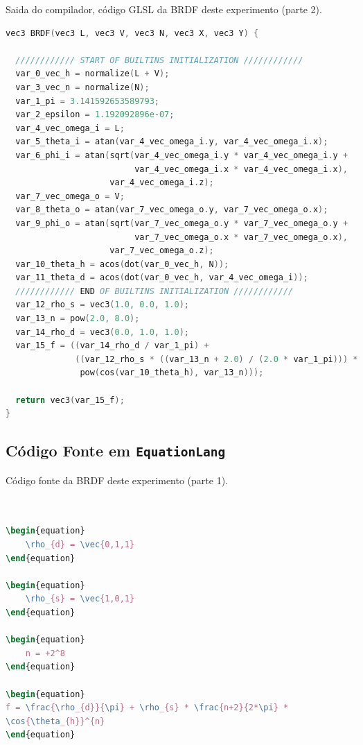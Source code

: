 \begin{codigo}[H]
    \caption{\small Saida do compilador, código GLSL da BRDF deste experimento  (parte 2). }
    \label{cod-blinn-phong-glsl-pt-2}
\begin{lstlisting}[language=C, inputencoding=utf8]
vec3 BRDF(vec3 L, vec3 V, vec3 N, vec3 X, vec3 Y) {

  //////////// START OF BUILTINS INITIALIZATION ////////////
  var_0_vec_h = normalize(L + V);
  var_3_vec_n = normalize(N);
  var_1_pi = 3.141592653589793;
  var_2_epsilon = 1.192092896e-07;
  var_4_vec_omega_i = L;
  var_5_theta_i = atan(var_4_vec_omega_i.y, var_4_vec_omega_i.x);
  var_6_phi_i = atan(sqrt(var_4_vec_omega_i.y * var_4_vec_omega_i.y +
                          var_4_vec_omega_i.x * var_4_vec_omega_i.x),
                     var_4_vec_omega_i.z);
  var_7_vec_omega_o = V;
  var_8_theta_o = atan(var_7_vec_omega_o.y, var_7_vec_omega_o.x);
  var_9_phi_o = atan(sqrt(var_7_vec_omega_o.y * var_7_vec_omega_o.y +
                          var_7_vec_omega_o.x * var_7_vec_omega_o.x),
                     var_7_vec_omega_o.z);
  var_10_theta_h = acos(dot(var_0_vec_h, N));
  var_11_theta_d = acos(dot(var_0_vec_h, var_4_vec_omega_i));
  //////////// END OF BUILTINS INITIALIZATION ////////////
  var_12_rho_s = vec3(1.0, 0.0, 1.0);
  var_13_n = pow(2.0, 8.0);
  var_14_rho_d = vec3(0.0, 1.0, 1.0);
  var_15_f = ((var_14_rho_d / var_1_pi) +
              ((var_12_rho_s * ((var_13_n + 2.0) / (2.0 * var_1_pi))) *
               pow(cos(var_10_theta_h), var_13_n)));

  return vec3(var_15_f);
}
\end{lstlisting}
\end{codigo}

\subsection{Código Fonte em \texttt{EquationLang}}
\begin{codigo}[H]
    \caption{\small Código fonte da BRDF deste experimento (parte 1).}
    \label{cod-blinn-phong-eqlang}
\begin{lstlisting}[language=tex, frame=none, inputencoding=utf8]


\begin{equation}
    \rho_{d} = \vec{0,1,1}
\end{equation}

\begin{equation}
    \rho_{s} = \vec{1,0,1}
\end{equation}

\begin{equation}
    n = +2^8
\end{equation}

\begin{equation}
f = \frac{\rho_{d}}{\pi} + \rho_{s} * \frac{n+2}{2*\pi} *
\cos{\theta_{h}}^{n}
\end{equation}
\end{lstlisting}
\end{codigo}
